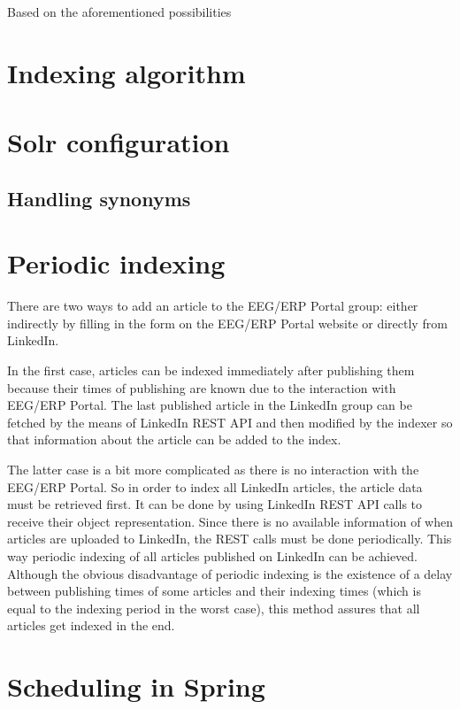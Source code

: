 \documentclass[12pt, oneside, a4paper]{book}
\begin{document}
Based on the aforementioned possibilities 


\section{Indexing algorithm}



\section{Solr configuration}

\subsection{Handling synonyms}


\section{Periodic indexing}

There are two ways to add an article to the EEG/ERP Portal group: either indirectly by filling in the form on the EEG/ERP Portal website or directly from LinkedIn.

In the first case, articles can be indexed immediately after publishing them because their times of publishing are known due to the interaction with EEG/ERP Portal. 
The last published article in the LinkedIn group can be fetched by the means of LinkedIn REST API and then modified by the indexer so that information about the article can be added to the index.

The latter case is a bit more complicated as there is no interaction with the EEG/ERP Portal. 
So in order to index all LinkedIn articles, the article data must be retrieved first.
It can be done by using LinkedIn REST API calls to receive their object representation.
Since there is no available information of when articles are uploaded to LinkedIn, the REST calls must be done periodically.
This way periodic indexing of all articles published on LinkedIn can be achieved.
Although the obvious disadvantage of periodic indexing is the existence of a delay between publishing times of some articles and their indexing times (which is equal to the indexing period in the worst case), this method assures that all articles get indexed in the end.

\section{Scheduling in Spring}
\end{document}
